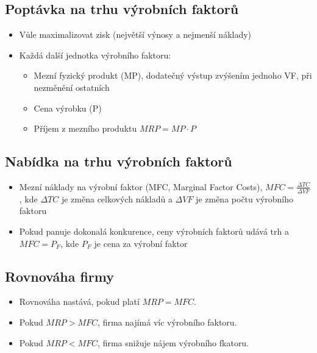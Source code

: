 \subsection{Poptávka na trhu výrobních faktorů}
\begin{itemize}
    \item Vůle maximalizovat zisk (největší výnosy a nejmenší náklady)
    \item Každá další jednotka výrobního faktoru:
    \begin{itemize}
        \item Mezní fyzický produkt (MP), dodatečný výstup zvýšením jednoho VF, při nezměnění ostatních
        \item Cena výrobku (P)
        \item Příjem z mezního produktu $MRP=MP\cdot P$
    \end{itemize}
\end{itemize}

\subsection{Nabídka na trhu výrobních faktorů}
\begin{itemize}
    \item Mezní náklady na výrobní faktor (MFC, Marginal Factor Costs), $MFC=\frac{\Delta TC}{\Delta VF}$,
    kde $\Delta TC$ je změna celkových nákladů a $\Delta VF$ je změna počtu výrobního faktoru
    \item Pokud panuje dokonalá konkurence, ceny výrobních faktorů udává trh a $MFC=P_F$, kde $P_F$ je
    cena za výrobní faktor
\end{itemize}

\subsection{Rovnováha firmy}
\begin{itemize}
    \item Rovnováha nastává, pokud platí $MRP=MFC$.
    \item Pokud $MRP>MFC$, firma najímá víc výrobního faktoru.
    \item Pokud $MRP<MFC$, firma snižuje nájem výrobního fkatoru.
\end{itemize}